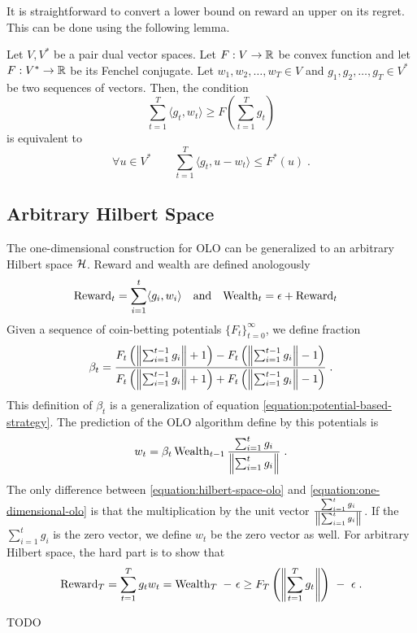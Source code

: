 It is straightforward to convert a lower bound on reward an upper on its regret.
This can be done using the following lemma.
\begin{lemma}
Let $V,V^*$ be a pair dual vector spaces.
Let $F:V \to \mathbb{R}$ be convex function and let $F:V^* \to \mathbb{R}$ be its Fenchel conjugate.
Let $w_1, w_2, \dots, w_T \in V$ and $g_1, g_2, \dots, g_T \in V^*$ be two
sequences of vectors.  Then, the condition
$$
\sum_{t=1}^T \langle g_t, w_t \rangle \ge F\left( \sum_{t=1}^T g_t \right)
$$
is equivalent to
$$
\forall u \in V^* \qquad \sum_{t=1}^T \langle g_t, u - w_t\rangle \le F^*(u) \; .
$$
\end{lemma}

\subsection{Arbitrary Hilbert Space}

The one-dimensional construction for OLO can be generalized to an arbitrary
Hilbert space $\mathcal{H}$. Reward and wealth are defined anologously
\begin{align*}
\operatorname{Reward}_t &= \sum_{i=1}^t \langle g_i, w_i \rangle &
& \text{and} &
\operatorname{Wealth}_t &= \epsilon + \operatorname{Reward}_t
\end{align*}
Given a sequence of coin-betting potentials $\{F_t\}_{t=0}^\infty$,
we define fraction
\begin{equation}
\label{equation:potential-based-strategy-hilbert-space}
\beta_t = \frac{F_t \left(\left\|{\sum_{i=1}^{t-1} g_i}\right\| + 1\right) - F_t\left(\left\|{\sum_{i=1}^{t-1} g_i}\right\| - 1 \right)}{F_t\left(\left\|{\sum_{i=1}^{t-1} g_i}\right\| + 1 \right) + F_t\left(\left\|{\sum_{i=1}^{t-1} g_i}\right\| - 1 \right)} \; .
\end{equation}
This definition of $\beta_t$ is a generalization of equation
\eqref{equation:potential-based-strategy}. The prediction of the OLO algorithm define by this
potentials is
\begin{equation}
\label{equation:hilbert-space-olo}
w_t = \beta_t \operatorname{Wealth}_{t-1} \frac{\sum_{i=1}^t g_i}{\left\|{\sum_{i=1}^t g_i}\right\|}  \; .
\end{equation}
The only difference between \eqref{equation:hilbert-space-olo}
and \eqref{equation:one-dimensional-olo} is that the multiplication
by the unit vector $\frac{\sum_{i=1}^t g_i}{\left\|{\sum_{i=1}^t g_i}\right\|}$.
If the $\sum_{i=1}^t g_i$ is the zero vector, we define $w_t$ be the zero vector
as well. For arbitrary Hilbert space, the hard part is to show that
$$
\operatorname{Reward}_T = \sum_{t=1}^T g_t w_t = \operatorname{Wealth}_T \ - \ \epsilon \ge F_T\left(\left\|{\sum_{t=1}^T g_t}\right\| \right) \ - \ \epsilon \; .
$$

TODO
